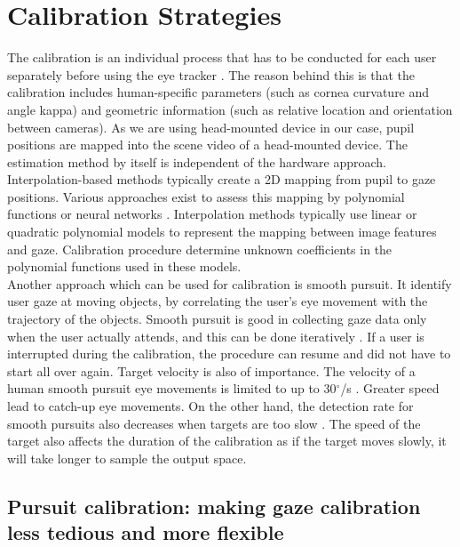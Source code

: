 \section{Calibration Strategies}

The calibration is an individual process that has to be conducted for each user separately before using the eye tracker \cite{13}. The reason behind this is that the calibration includes human-specific parameters (such as cornea curvature and angle kappa) and geometric information (such as relative location and orientation between cameras). As we are using head-mounted device in our case, pupil positions are mapped into the scene video of a head-mounted device. The estimation method by itself is independent of the hardware approach. Interpolation-based methods typically create a 2D mapping from pupil to gaze positions. Various approaches exist to assess this mapping by polynomial functions \cite{26} or neural networks \cite{27}. Interpolation methods typically use linear or quadratic polynomial models to represent the mapping between image features and gaze. Calibration procedure determine unknown coefficients in the polynomial functions used in these models.\\

Another approach which can be used for calibration is smooth pursuit. It identify user gaze at moving objects, by correlating the user’s eye movement with the trajectory of the objects. Smooth pursuit is good in collecting gaze data only when the user actually attends, and this can be done iteratively \cite{4}. If a user is interrupted during the calibration, the procedure can resume and did not have to start all over again. Target velocity is also of importance. The velocity of a human smooth pursuit eye movements is limited to up to 30$^{\circ}$/s \cite{5}. Greater speed lead to catch-up eye movements. On the other hand, the detection rate for smooth pursuits also decreases when targets are too slow \cite{6}. The speed of the target also affects the duration of the calibration as if the target moves slowly, it will take longer to sample the output space. 

\subsection{Pursuit calibration: making gaze calibration less tedious and more flexible}

